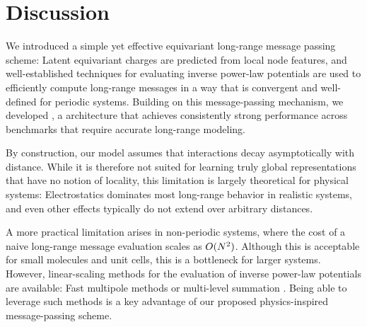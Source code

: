 \documentclass[10pt]{article} %
\newcommand{\ML}[1]{#1}
\begin{document}
\begin{table}
    \centering
    \caption{Ability of different \lorem models, with and without long-range message passing and with different numbers of short-range message passing steps, to solve the cumulene benchmark task. A tick (\yes) indicates yes, a cross (\no) indicates no.  shows the full curves.}
    
    \label{tab:cumulene-cutoffs}
\end{table}




\section{Discussion}

We introduced a simple yet effective equivariant long-range message passing scheme: Latent equivariant charges are predicted from local node features, and well-established techniques for evaluating inverse power-law potentials are used to efficiently compute long-range messages in a way that is convergent and well-defined for periodic systems. Building on this message-passing mechanism, we developed \lorem, a \mlp architecture that achieves consistently strong performance across benchmarks that require accurate \ML{long-range modeling}.

By construction, our model assumes that interactions decay asymptotically with distance. While it is therefore not suited for learning truly global representations that have no notion of locality, this limitation is largely theoretical for physical systems: Electrostatics dominates most long-range behavior in realistic systems, and even other effects typically do not extend over arbitrary distances.

A more practical limitation arises in non-periodic systems, where the cost of a naive long-range message evaluation scales as $O(N^2)$. Although this is acceptable for small molecules and unit cells, this is a bottleneck for larger systems. However, linear-scaling methods for the evaluation of inverse power-law potentials are available: Fast multipole methods \citep{gr1987,pybbfmm} or multi-level summation \citep{hwpsss2015,bsucm2025pre}. Being able to leverage such methods is a key advantage of our proposed physics-inspired message-passing scheme.
\end{document}

